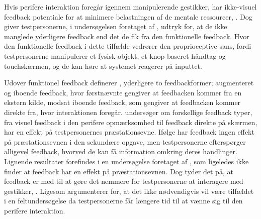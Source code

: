 Hvis perifere interaktion foregår igennem manipulerende gestikker, har ikke-visuel feedback potentiale for at minimere belastningen af de mentale ressourcer, \parencite[s. 3]{PDF:FacilitatingPIDesignAndEvaluation}. Dog giver testpersonerne, i undersøgelsen foretaget af \textcite[s. 173]{PDF:ComparingInputModalities}, udtryk for, at de ikke manglede yderligere feedback end det de fik fra den funktionelle feedback. Hvor den funktionelle feedback i dette tilfælde vedrører den proprioceptive sans, fordi testpersonerne manipulerer et fysisk objekt, et knop-baseret håndtag og touchskærmen, og de kan høre at systemet reagerer på inputtet.

Udover funktionel feedback definerer \textcite[s. 3]{PDF:InteractionFrogger}, yderligere to feedbackformer; augmenteret og iboende feedback, hvor førstnævnte gengiver at feedbacken kommer fra en ekstern kilde, modsat iboende feedback, som gengiver at feedbacken kommer direkte fra, hvor interaktionen foregår. \blankline
%
\textcite[ss. 1263-1268]{PDF:ComparingModFeedback} undersøger om forskellige feedback typer, fra visuel feedback i den perifere opmærksomhed til feedback direkte på skærmen, har en effekt på testpersonernes præstationsevne. Ifølge \textcite[ss. 1267-1268]{PDF:ComparingModFeedback} har feedback ingen effekt på præstationsevnen i den sekundære opgave, men testpersonerne efterspørger alligevel feedback, hvorved de kan få information omkring deres handlinger. Lignende resultater forefindes i en undersøgelse foretaget af \textcite[s. 8]{PDF:DoThatThere}, som ligeledes ikke finder at feedback har en effekt på præstationsevnen. Dog tyder det på, at feedback er med til at gøre det nemmere for testpersonerne at interagere med gestikker, \parencite[s. 8]{PDF:DoThatThere}. Ligesom \textcite[s. 174]{PDF:ComparingInputModalities} argumenterer \textcite[s. 1268]{PDF:ComparingModFeedback} for, at det ikke nødvendigvis vil være tilfældet i en feltundersøgelse da testpersonerne får længere tid til at vænne sig til den perifere interaktion. 

